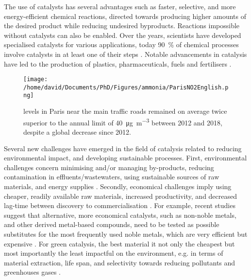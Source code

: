 The use of catalysts has several advantages such as faster, selective, and more energy-efficient chemical reactions, directed towards producing higher amounts of the desired product while reducing undesired byproducts.
Reactions impossible without catalysts can also be enabled.
Over the years, scientists have developed specialised catalysts for various applications, today \qty{90}{\percent} of chemical processes involve catalysts in at least one of their steps \parencite{Weiner1998, DeVries2012}.
Notable advancements in catalysis have led to the production of plastics, pharmaceuticals, fuels and fertilisers \parencite{Fechete2012}.

\begin{figure}[!htb]
    \centering
    \texttt{[image: /home/david/Documents/PhD/Figures/ammonia/ParisNO2English.png]}
    \caption{
         levels in Paris near the main traffic roads remained on average twice superior to the annual limit of \qty{40}{\ug \per \m^3} \parencite{AirParis} between 2012 and 2018, despite a global decrease since 2012.
    }
    \label{fig:NO2Paris}
\end{figure}

Several new challenges have emerged in the field of catalysis related to reducing environmental impact, and developing sustainable processes.
First, environmental challenges concern minimising and/or managing by-products, reducing contamination in effluents/wastewaters, using sustainable sources of raw materials, and energy supplies \parencite{Ludwig2017, Lange2021}.
Secondly, economical challenges imply using cheaper, readily available raw materials, increased productivity, and decreased lag-time between discovery to commercialisation \parencite{Keisuke2019, Gunay2021}.
For example, recent studies suggest that alternative, more economical catalysts, such as non-noble metals, and other derived metal-based compounds, need to be tested as possible substitutes for the most frequently used noble metals, which are very efficient but expensive \parencite{Zhong2021, Ruan2022}.
For green catalysis, the best material it not only the cheapest but most importantly the least impactful on the environment, e.g. in terms of material extraction, life span, and selectivity towards reducing pollutants and greenhouses gases \parencite{Lange2021}.

